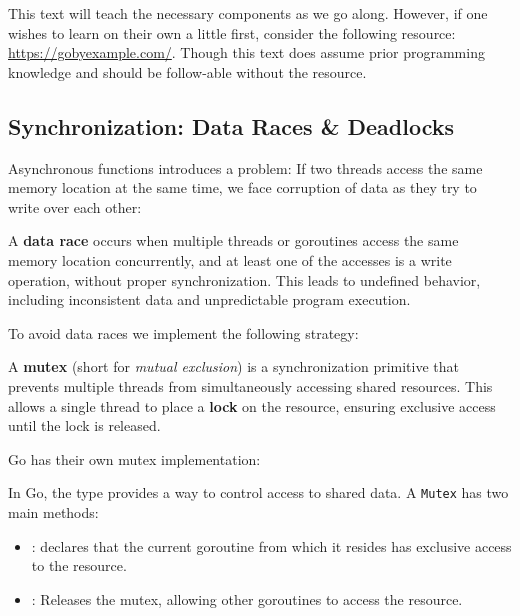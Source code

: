 \begin{Tip}
    This text will teach the necessary components as we go along. However, if one wishes to learn on their own 
    a little first, consider the following resource: \href{https://gobyexample.com/}{https://gobyexample.com/}.
    Though this text does assume prior programming knowledge and should be follow-able without the resource.
\end{Tip}
\subsection{Synchronization: Data Races \& Deadlocks}
\noindent
Asynchronous functions introduces a problem: If two threads access the same memory location at the same time,
we face corruption of data as they try to write over each other:
\begin{Def}

    A \textbf{data race} occurs when multiple threads or goroutines access the same memory location concurrently, and at least one of the accesses is a write operation, without proper synchronization. This leads to undefined behavior, including inconsistent data and unpredictable program execution.
    \end{Def}
        
\noindent
To avoid data races we implement the following strategy:
\begin{Def}

    A \textbf{mutex} (short for \emph{mutual exclusion}) is a synchronization primitive that prevents multiple threads from simultaneously accessing shared resources. This allows a single thread to place a \textbf{lock} on the resource, ensuring exclusive access until the lock is released.
\end{Def}

\newpage
    
\noindent
Go has their own mutex implementation:
\begin{Def}[Go Mutex]
    
    In Go, the  type provides a way to control access to shared data. A \texttt{Mutex} has two main methods:
    \begin{itemize}
        \item {}: declares that the current goroutine from which it resides has exclusive access to the resource.
        \item {}: Releases the mutex, allowing other goroutines to access the resource.
    \end{itemize}
\end{Def}
    
